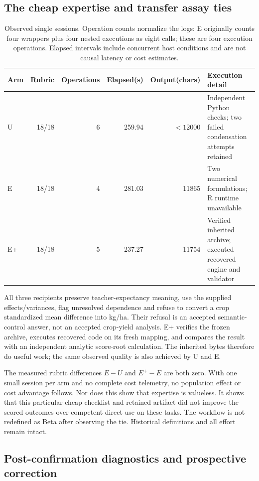 \documentclass[11pt]{article}
\begin{document}
\subsection{The cheap expertise and transfer assay ties}

\begin{table}[htbp]
\begin{tabularx}{\textwidth}{lrrrrY}
\toprule
Arm & Rubric & Operations & Elapsed(s) & Output(chars) & Execution detail\\
\midrule
U &18/18&6&259.94&$<12000$&Independent Python checks; two failed condensation attempts retained\\
E &18/18&4&281.03&11865&Two numerical formulations; R runtime unavailable\\
E+ &18/18&5&237.27&11754&Verified inherited archive; executed recovered engine and validator\\
\bottomrule
\end{tabularx}
\caption{Observed single sessions. Operation counts normalize the logs: E originally counts four wrappers plus four nested executions as eight calls; these are four execution operations. Elapsed intervals include concurrent host conditions and are not causal latency or cost estimates.}
\end{table}

All three recipients preserve teacher-expectancy meaning, use the supplied effects/variances, flag unresolved dependence and refuse to convert a crop standardized mean difference into kg/ha. Their refusal is an accepted semantic-control answer, not an accepted crop-yield analysis. E+ verifies the frozen archive, executes recovered code on its fresh mapping, and compares the result with an independent analytic score-root calculation. The inherited bytes therefore do useful work; the same observed quality is also achieved by U and E.

The measured rubric differences $E-U$ and $E^+-E$ are both zero. With one small session per arm and no complete cost telemetry, no population effect or cost advantage follows. Nor does this show that expertise is valueless. It shows that this particular cheap checklist and retained artifact did not improve the scored outcomes over competent direct use on these tasks. The workflow is not redefined as Beta after observing the tie. Historical definitions and all effort remain intact.

\subsection{Post-confirmation diagnostics and prospective correction}
\end{document}

